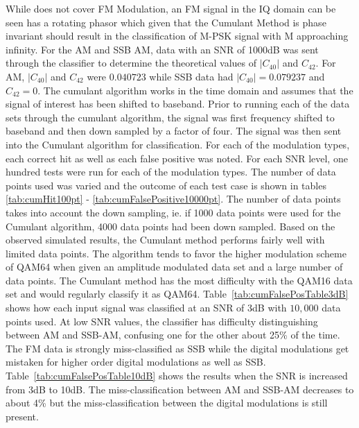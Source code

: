 While \cite{swami2000} does not cover FM Modulation, an FM signal in the IQ
domain can be seen has a rotating phasor which given that the Cumulant Method is
phase invariant should result in the classification of M-PSK signal with M
approaching infinity.  
For the AM and SSB AM, data with an SNR of 1000dB was sent through the
classifier to determine the theoretical values of $|C_{40}|$ and $C_{42}$.  For AM,
$|C_{40}|$ and $C_{42}$ were $0.040723$ while SSB data had $|C_{40}| = 0.079237$ and
$C_{42} = 0$.
The cumulant algorithm works in the time domain and assumes that the signal of
interest has been shifted to baseband.  Prior to running each of the data sets
through the cumulant algorithm, the signal was first frequency shifted to
baseband and then down sampled by a factor of four.  The signal was then sent
into the Cumulant algorithm for classification.  For each of the modulation
types, each correct hit as well as each false positive was noted.  For each
SNR level, one hundred tests were run for each of the modulation types.  
The number of data points used was varied and the outcome of each test case is
shown in tables \ref{tab:cumHit100pt} - \ref{tab:cumFalsePositive10000pt}.  The
number of data points takes into account the down sampling, ie. if 1000 data
points were used for the Cumulant algorithm, 4000 data points had been down
sampled.
Based on the observed simulated results, the Cumulant method performs fairly
well with limited data points.  The algorithm tends to favor the higher modulation
scheme of QAM64 when given an amplitude modulated data set and a large number of
data points.  The Cumulant method has the most difficulty with the QAM16 data set
and would regularly classify it as QAM64.
Table~\ref{tab:cumFalsePosTable3dB} shows how each input signal was classified
at an SNR of 3dB with $10,000$ data points used.  At low SNR values, the
classifier has difficulty distinguishing between AM and SSB-AM, confusing one
for the other about 25\% of the time.
The FM data is strongly miss-classified as SSB while the digital modulations get
mistaken for higher order digital modulations as well as SSB. 
Table~\ref{tab:cumFalsePosTable10dB} shows the results when the SNR is increased
from 3dB to 10dB.  The miss-classification between AM and SSB-AM decreases to
about 4\% but the miss-classification between the digital modulations is still
present.  


